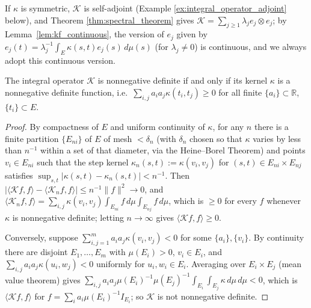 If $\kappa$ is symmetric, $\mathcal{K}$ is self-adjoint (Example
\ref{ex:integral_operator_adjoint} below), and Theorem
\ref{thm:spectral_theorem} gives $\mathcal{K}=\sum_{j\geq 1}\lambda_je_j
\otimes e_j$; by Lemma~\ref{lem:kf_continuous}, the version of $e_j$ given
by $e_j(t)=\lambda_j^{-1}\int_E\kappa(s,t)e_j(s)\,d\mu(s)$ (for
$\lambda_j\neq 0$) is continuous, and we always adopt this continuous
version.


\begin{theorem}
\label{thm:kernel_nonneg_def}
The integral operator $\mathcal{K}$ is nonnegative definite if and only if
its kernel $\kappa$ is a nonnegative definite function, i.e.\
$\sum_{i,j}a_ia_j\kappa(t_i,t_j)\geq 0$ for all finite $\{a_i\}\subset
\mathbb{R}$, $\{t_i\}\subset E$.
\end{theorem}

\begin{proof}
By compactness of $E$ and uniform continuity of $\kappa$, for any $n$
there is a finite partition $\{E_{ni}\}$ of $E$ of mesh $<\delta_n$ (with
$\delta_n$ chosen so that $\kappa$ varies by less than $n^{-1}$ within a
set of that diameter, via the Heine--Borel Theorem) and points $v_i\in
E_{ni}$ such that the step kernel $\kappa_n(s,t):=\kappa(v_i,v_j)$ for
$(s,t)\in E_{ni}\times E_{nj}$ satisfies $\sup_{s,t}|\kappa(s,t)-
\kappa_n(s,t)|<n^{-1}$. Then $|\langle\mathcal{K}f,f\rangle-\langle
\mathcal{K}_nf,f\rangle|\leq n^{-1}\|f\|^2\to 0$, and $\langle\mathcal{K}_n
f,f\rangle = \sum_{i,j}\kappa(v_i,v_j)\int_{E_{ni}}f\,d\mu\int_{E_{nj}}
f\,d\mu$, which is $\geq 0$ for every $f$ whenever $\kappa$ is nonnegative
definite; letting $n\to\infty$ gives $\langle\mathcal{K}f,f\rangle\geq 0$.

Conversely, suppose $\sum_{i,j=1}^ma_ia_j\kappa(v_i,v_j)<0$ for some
$\{a_i\},\{v_i\}$. By continuity there are disjoint $E_1,\dots,E_m$ with
$\mu(E_i)>0$, $v_i\in E_i$, and $\sum_{i,j}a_ia_j\kappa(u_i,w_j)<0$
uniformly for $u_i,w_i\in E_i$. Averaging over $E_i\times E_j$ (mean value
theorem) gives $\sum_{i,j}a_ia_j\mu(E_i)^{-1}\mu(E_j)^{-1}\int_{E_i}
\int_{E_j}\kappa\,d\mu\,d\mu <0$, which is $\langle\mathcal{K}f,f\rangle$
for $f=\sum_ia_i\mu(E_i)^{-1}I_{E_i}$; so $\mathcal{K}$ is not nonnegative
definite.
\end{proof}

